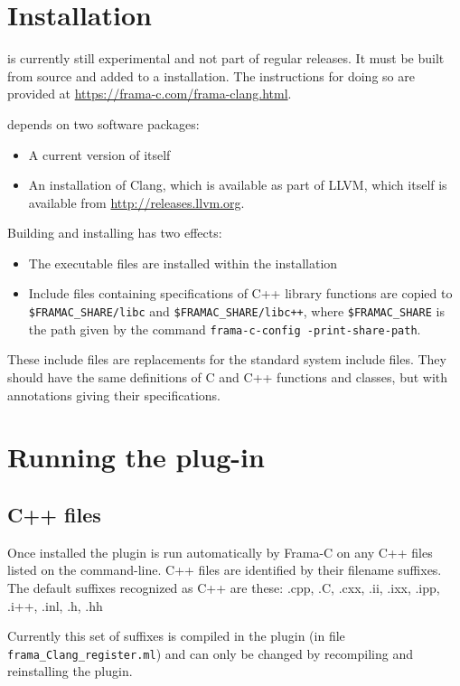 

\chapter{Installation}

\fclang is currently still experimental and not part of regular \framac releases. It must be built from source and added to a \framac installation.
The instructions for doing so are provided at 
\url{https://frama-c.com/frama-clang.html}.

\fclang depends on two software packages:
\begin{itemize}
\item A current version of \framac itself
\item An installation of Clang, which is available as part of LLVM,
which itself is available from \url{http://releases.llvm.org}.
\end{itemize}

Building and installing \fclang has two effects:
\begin{itemize}
\item The \fclang executable files are installed within the \framac installation
\item Include files containing \acslpp specifications of C++ library functions
are copied to \verb|$FRAMAC_SHARE/libc| and 
\verb|$FRAMAC_SHARE/libc++|, where \verb|$FRAMAC_SHARE| is the path
given by the command \lstinline|frama-c-config -print-share-path|.
\end{itemize}
These include files are replacements for the standard system include files.
They should have the same definitions of C and C++ functions and classes, but
with \acslpp annotations giving their specifications.

\chapter{Running the plug-in}

\section{C++ files}
Once installed the plugin is run automatically by Frama-C on any C++ files listed on the command-line. C++ files are identified by their filename suffixes. The default suffixes recognized as C++ are these:
 .cpp, .C, .cxx, .ii, .ixx, .ipp, .i++, .inl, .h, .hh

Currently this set of suffixes is compiled in the plugin (in file \texttt{frama\_Clang\_register.ml}) and can only be changed by recompiling and
reinstalling the plugin.

